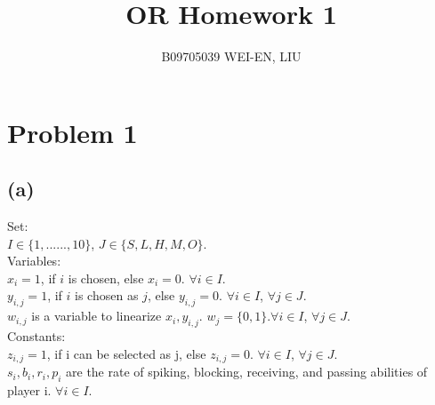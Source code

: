 \documentclass[12pt, a4paper]{article}
\title{OR Homework 1}
\author{B09705039 WEI-EN, LIU}
\date{}
\begin{document}
\maketitle


\section{Problem 1}

\subsection{(a)}
Set:\\
$I \in \{{1,......,10}\}$, $J \in \{{S,L,H,M,O}\}$.\\
Variables:\\
$x_i = 1$, if $i$ is chosen, else $x_i = 0$. $\forall i \in I$.\\
$y_{i,j} = 1$, if $i$ is chosen as $j$, else $y_{i,j} = 0$. $\forall i \in I$, $\forall j \in J$.\\
$w_{i, j}$ is a variable to linearize $x_i, y_{i,j}$. $w_j = \{0, 1\}$.$\forall i \in I$, $\forall j \in J$.\\
Constants:\\
$z_{i,j} = 1$, if i can be selected as j, else $z_{i,j} = 0$. $\forall i \in I$, $\forall j \in J$.\\
$s_i, b_i, r_i, p_i$ are the rate of spiking, blocking, receiving, and passing abilities of player i. $\forall i \in I$.\\
\end{document}
